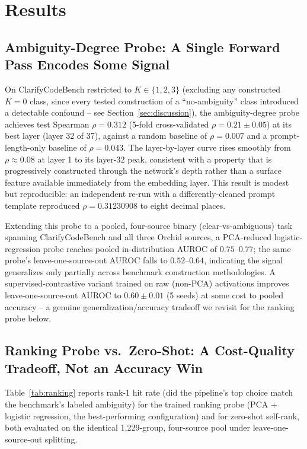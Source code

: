 \section{Results}
\label{sec:results}

\subsection{Ambiguity-Degree Probe: A Single Forward Pass Encodes Some Signal}
\label{sec:results:k-probe}

On ClarifyCodeBench restricted to $K \in \{1,2,3\}$ (excluding any
constructed $K{=}0$ class, since every tested construction of a
``no-ambiguity'' class introduced a detectable confound -- see
Section~\ref{sec:discussion}), the ambiguity-degree probe achieves test
Spearman $\rho = 0.312$ (5-fold cross-validated $\rho = 0.21 \pm 0.05$) at
its best layer (layer 32 of 37), against a random baseline of $\rho =
0.007$ and a prompt-length-only baseline of $\rho = 0.043$. The
layer-by-layer curve rises smoothly from $\rho \approx 0.08$ at layer 1 to
its layer-32 peak, consistent with a property that is progressively
constructed through the network's depth rather than a surface feature
available immediately from the embedding layer. This result is modest but
reproducible: an independent re-run with a differently-cleaned prompt
template reproduced $\rho = 0.31230908$ to eight decimal places.

Extending this probe to a pooled, four-source binary (clear-vs-ambiguous)
task spanning ClarifyCodeBench and all three Orchid sources, a
PCA-reduced logistic-regression probe reaches pooled in-distribution AUROC
of $0.75$--$0.77$; the same probe's leave-one-source-out AUROC falls to
$0.52$--$0.64$, indicating the signal generalizes only partially across
benchmark construction methodologies. A supervised-contrastive variant
trained on raw (non-PCA) activations improves leave-one-source-out AUROC to
$0.60 \pm 0.01$ (5 seeds) at some cost to pooled accuracy -- a genuine
generalization/accuracy tradeoff we revisit for the ranking probe below.

\subsection{Ranking Probe vs.\ Zero-Shot: A Cost-Quality Tradeoff, Not an Accuracy Win}
\label{sec:results:ranking}

Table~\ref{tab:ranking} reports rank-1 hit rate (did the pipeline's top
choice match the benchmark's labeled ambiguity) for the trained ranking
probe (PCA + logistic regression, the best-performing configuration) and
for zero-shot self-rank, both evaluated on the identical 1,229-group,
four-source pool under leave-one-source-out splitting.

